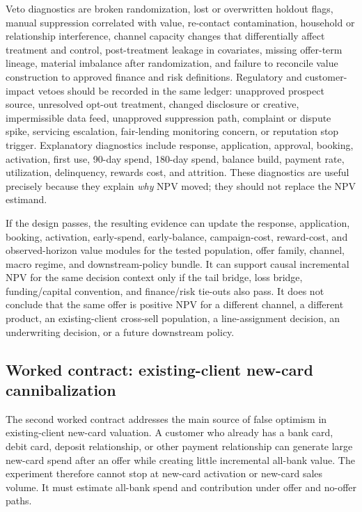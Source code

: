 \documentclass[11pt]{article}
\newcommand{\1}{\mathbf{1}}
\begin{document}
Veto diagnostics are broken randomization, lost or overwritten holdout flags,
manual suppression correlated with value, re-contact contamination, household
or relationship interference, channel capacity changes that differentially
affect treatment and control, post-treatment leakage in covariates, missing
offer-term lineage, material imbalance after randomization, and failure to
reconcile value construction to approved finance and risk definitions.
Regulatory and customer-impact vetoes should be recorded in the same ledger:
unapproved prospect source, unresolved opt-out treatment, changed disclosure
or creative, impermissible data feed, unapproved suppression path, complaint
or dispute spike, servicing escalation, fair-lending monitoring concern, or
reputation stop trigger.
Explanatory diagnostics include response, application, approval, booking,
activation, first use, 90-day spend, 180-day spend, balance build, payment
rate, utilization, delinquency, rewards cost, and attrition. These diagnostics
are useful precisely because they explain \emph{why} NPV moved; they should
not replace the NPV estimand.

If the design passes, the resulting evidence can update the response,
application, booking, activation, early-spend, early-balance, campaign-cost,
reward-cost, and observed-horizon value modules for the tested population,
offer family, channel, macro regime, and downstream-policy bundle. It can
support causal incremental NPV for the same decision context only if the tail
bridge, loss bridge, funding/capital convention, and finance/risk tie-outs also
pass. It does not conclude that the same offer is positive NPV for a different
channel, a different product, an existing-client cross-sell population, a
line-assignment decision, an underwriting decision, or a future downstream
policy.

\subsection{Worked contract: existing-client new-card cannibalization}
\label{subsec:worked-cannibalization-contract}

The second worked contract addresses the main source of false optimism in
existing-client new-card valuation. A customer who already has a bank card,
debit card, deposit relationship, or other payment relationship can generate
large new-card spend after an offer while creating little incremental
all-bank value. The experiment therefore cannot stop at new-card activation or
new-card sales volume. It must estimate all-bank spend and contribution under
offer and no-offer paths.
\end{document}
